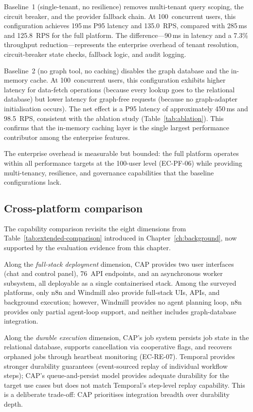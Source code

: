 \documentclass[a4paper]{sapthesis}
\begin{document}
Baseline~1 (single-tenant, no resilience) removes multi-tenant query
scoping, the circuit breaker, and the provider fallback chain.  At
100~concurrent users, this configuration achieves 195\,ms P95 latency
and 135.0~RPS, compared with 285\,ms and 125.8~RPS for the full
platform.  The difference---90\,ms in latency and a 7.3\% throughput
reduction---represents the enterprise overhead of tenant resolution,
circuit-breaker state checks, fallback logic, and audit logging.

Baseline~2 (no graph tool, no caching) disables the graph database and
the in-memory cache.  At 100~concurrent users, this configuration
exhibits higher latency for data-fetch operations (because every lookup
goes to the relational database) but lower latency for graph-free
requests (because no graph-adapter initialisation occurs).  The net
effect is a P95 latency of approximately 450\,ms and 98.5~RPS,
consistent with the ablation study (Table~\ref{tab:ablation}).  This
confirms that the in-memory caching layer is the single largest
performance contributor among the enterprise features.

The enterprise overhead is measurable but bounded: the full platform
operates within all performance targets at the 100-user level (EC-PF-06)
while providing multi-tenancy, resilience, and governance capabilities
that the baseline configurations lack.

\subsection{Cross-platform comparison}

The capability comparison revisits the eight dimensions from
Table~\ref{tab:extended-comparison} introduced in
Chapter~\ref{ch:background}, now supported by the evaluation evidence
from this chapter.

Along the \emph{full-stack deployment} dimension, CAP provides two user
interfaces (chat and control panel), 76~API endpoints, and an
asynchronous worker subsystem, all deployable as a single containerised
stack.  Among the surveyed platforms, only n8n and Windmill also provide
full-stack UIs, APIs, and background execution; however, Windmill
provides no agent planning loop, n8n provides only partial agent-loop
support, and neither includes graph-database integration.

Along the \emph{durable execution} dimension, CAP's job system persists
job state in the relational database, supports cancellation via
cooperative flags, and recovers orphaned jobs through heartbeat
monitoring (EC-RE-07).  Temporal provides stronger durability guarantees
(event-sourced replay of individual workflow steps); CAP's queue-and-persist
model provides adequate durability for the target use cases but does not
match Temporal's step-level replay capability.  This is a deliberate
trade-off: CAP prioritises integration breadth over durability depth.
\end{document}
